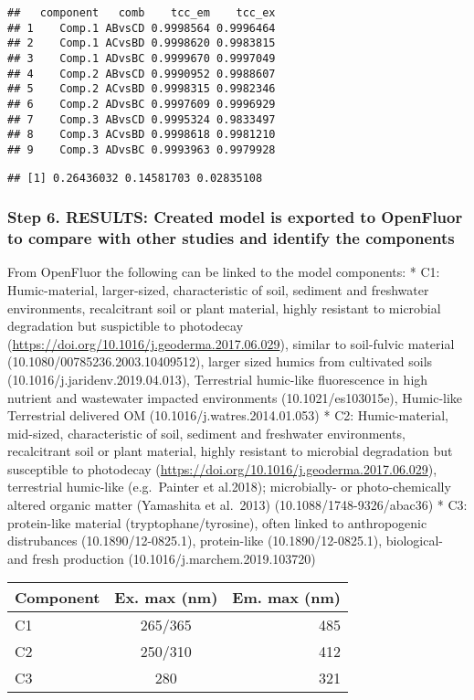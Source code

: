 \documentclass[
]{article}
\begin{document}
\begin{verbatim}
##   component   comb    tcc_em    tcc_ex
## 1    Comp.1 ABvsCD 0.9998564 0.9996464
## 2    Comp.1 ACvsBD 0.9998620 0.9983815
## 3    Comp.1 ADvsBC 0.9999670 0.9997049
## 4    Comp.2 ABvsCD 0.9990952 0.9988607
## 5    Comp.2 ACvsBD 0.9998315 0.9982346
## 6    Comp.2 ADvsBC 0.9997609 0.9996929
## 7    Comp.3 ABvsCD 0.9995324 0.9833497
## 8    Comp.3 ACvsBD 0.9998618 0.9981210
## 9    Comp.3 ADvsBC 0.9993963 0.9979928
\end{verbatim}

\begin{verbatim}
## [1] 0.26436032 0.14581703 0.02835108
\end{verbatim}

\hypertarget{step-6.-results-created-model-is-exported-to-openfluor-to-compare-with-other-studies-and-identify-the-components}{%
\subsubsection{Step 6. RESULTS: Created model is exported to OpenFluor
to compare with other studies and identify the
components}\label{step-6.-results-created-model-is-exported-to-openfluor-to-compare-with-other-studies-and-identify-the-components}}

From OpenFluor the following can be linked to the model components: *
C1: Humic-material, larger-sized, characteristic of soil, sediment and
freshwater environments, recalcitrant soil or plant material, highly
resistant to microbial degradation but suspictible to photodecay
(\url{https://doi.org/10.1016/j.geoderma.2017.06.029}), similar to
soil-fulvic material (10.1080/00785236.2003.10409512), larger sized
humics from cultivated soils (10.1016/j.jaridenv.2019.04.013),
Terrestrial humic-like fluorescence in high nutrient and wastewater
impacted environments (10.1021/es103015e), Humic-like Terrestrial
delivered OM (10.1016/j.watres.2014.01.053) * C2: Humic-material,
mid-sized, characteristic of soil, sediment and freshwater environments,
recalcitrant soil or plant material, highly resistant to microbial
degradation but susceptible to photodecay
(\url{https://doi.org/10.1016/j.geoderma.2017.06.029}), terrestrial
humic-like (e.g.~Painter et al.2018); microbially- or photo-chemically
altered organic matter (Yamashita et al.~2013)
(10.1088/1748-9326/abac36) * C3: protein-like material
(tryptophane/tyrosine), often linked to anthropogenic distrubances
(10.1890/12-0825.1), protein-like (10.1890/12-0825.1), biological- and
fresh production (10.1016/j.marchem.2019.103720)

\begin{longtable}[]{@{}lcr@{}}
\toprule
Component & Ex. max (nm) & Em. max (nm) \\
\midrule
\endhead
C1 & 265/365 & 485 \\
C2 & 250/310 & 412 \\
C3 & 280 & 321 \\
\bottomrule
\end{longtable}
\end{document}
